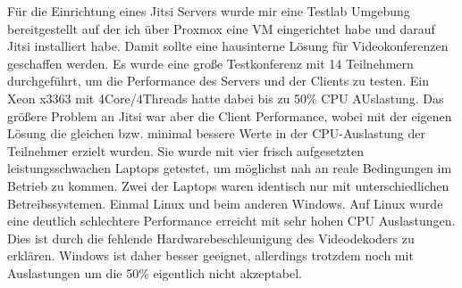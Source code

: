 \documentclass[english,runningheads,a4paper]{llncs}[2018/03/10]
\begin{document}
Für die Einrichtung eines Jitsi Servers wurde mir eine Testlab Umgebung bereitgestellt auf der ich über Proxmox eine VM eingerichtet habe und darauf Jitsi installiert habe. Damit sollte eine hausinterne Lösung für Videokonferenzen geschaffen werden. Es wurde eine große Testkonferenz mit 14 Teilnehmern durchgeführt, um die Performance des Servers und der Clients zu testen. Ein Xeon x3363 mit 4Core/4Threads hatte dabei bis zu 50\% CPU AUslastung. Das größere Problem an Jitsi war aber die Client Performance, wobei mit der eigenen Lösung die  gleichen bzw. minimal  bessere Werte in der CPU-Auslastung der Teilnehmer erzielt wurden. Sie wurde mit vier frisch aufgesetzten leistungsschwachen Laptops getestet, um möglichst nah an reale Bedingungen im Betrieb zu kommen. Zwei der Laptops waren identisch nur mit unterschiedlichen Betreibssystemen. Einmal Linux und beim anderen Windows. Auf Linux wurde eine deutlich schlechtere Performance erreicht mit sehr hohen CPU Auslastungen. Dies ist durch die fehlende Hardwarebeschleunigung des Videodekoders zu erklären. Windows ist daher besser geeignet, allerdings trotzdem noch mit Auslastungen um die 50\% eigentlich nicht akzeptabel.
\end{document}
